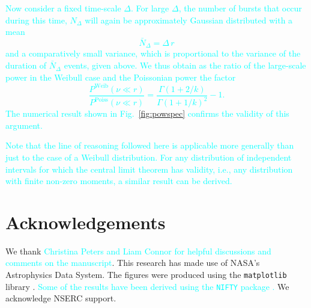 \documentclass[fleqn,usenatbib]{mnras}
\newcommand{\new}[1]{\textcolor{cyan}{#1}}
\begin{document}
\new{Now consider a fixed time-scale $\Delta$. For large $\Delta$, the number of bursts that occur during this time, $N_\Delta$ will again be approximately Gaussian distributed with a mean
\begin{equation}
	\bar{N}_\Delta = \Delta \, r
\end{equation}
and a comparatively small variance, which is proportional to the variance of the duration of $\bar{N}_\Delta$ events, given above. We thus obtain as the ratio of the large-scale power in the Weibull case and the Poissonian power the factor
\begin{equation}
	\frac{P^{\mathrm{Weib}}(\nu \ll r)}{P^{\mathrm{Poiss}}(\nu \ll r)} = \frac{\Gamma\left(1 + 2/k\right)}{\Gamma\left(1 + 1/k\right)^2} - 1.
\end{equation}
The numerical result shown in Fig.~\ref{fig:powspec} confirms the validity of this argument.}

\new{Note that the line of reasoning followed here is applicable more generally than just to the case of a Weibull distribution. For any distribution of independent intervals for which the central limit theorem has validity, i.e., any distribution with finite non-zero moments, a similar result can be derived.}


\section*{Acknowledgements}

We thank \new{Christina Peters and Liam Connor for helpful discussions and comments on the manuscript}. This research has made use of NASA's Astrophysics Data System. The figures were produced using the \texttt{matplotlib} library \citep{hunter-2007}. \new{Some of the results have been derived using the \texttt{NIFTY} package \citep{selig-2013}.} We acknowledge NSERC support.







\bsp
\label{lastpage}
\end{document}
